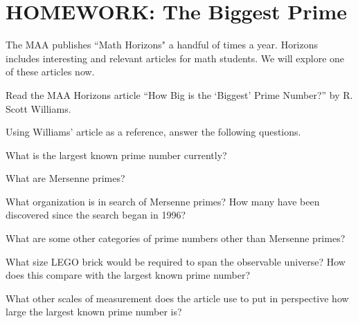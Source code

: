 
\section{HOMEWORK: The Biggest Prime}

The MAA publishes ``Math Horizons" a handful of times a year. Horizons includes interesting and relevant articles for math students. We will explore one of these articles now.

\begin{exercise}
Read the MAA Horizons article “How Big is the ‘Biggest’ Prime Number?” by R. Scott Williams. \cite{biggest_prime}
\end{exercise}

\noindent Using Williams' article as a reference, answer the following questions.

\begin{exercise}
What is the largest known prime number currently?
\end{exercise}

\blanks

\begin{exercise}
What are Mersenne primes?
\end{exercise}

\blanks

\begin{exercise}
What organization is in search of Mersenne primes? How many have been discovered since the search began in 1996?
\end{exercise}

\blanks

\begin{exercise}
What are some other categories of prime numbers other than Mersenne primes?
\end{exercise}

\blanks

\begin{exercise}
What size LEGO brick would be required to span the observable universe? How does this compare with the largest known prime number?
\end{exercise}

\blanks

\begin{exercise}
What other scales of measurement does the article use to put in perspective how large the largest known prime number is?
\end{exercise}

